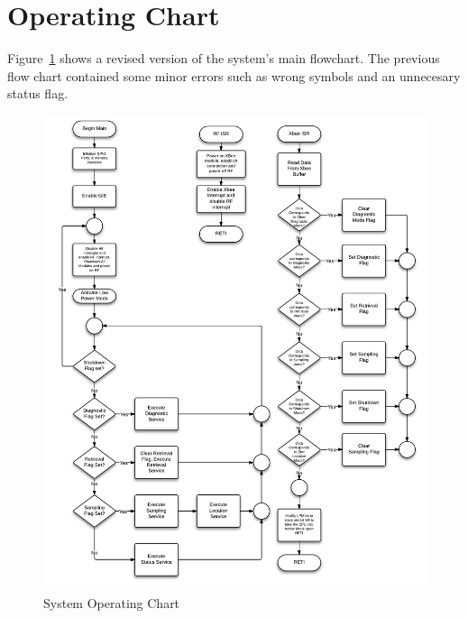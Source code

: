\section{Operating Chart}

Figure~\ref{fig:systemFlowchart} shows a revised version of the system's main flowchart. The previous flow chart contained some minor errors such as wrong symbols and an unnecesary status flag.

\begin{figure}[H]
	\centering
	\includegraphics[width=\textwidth]{img/SystemFlowchart}
	\caption{System Operating Chart \label{fig:systemFlowchart}}
\end{figure}